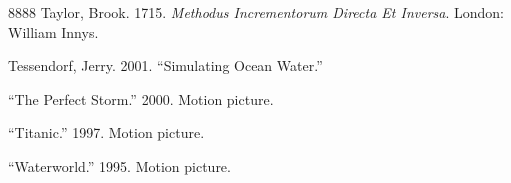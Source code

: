 \begin{thebibliography}{8888}
Taylor, Brook. 1715. \emph{Methodus Incrementorum Directa Et Inversa}.
London: William Innys.

Tessendorf, Jerry. 2001. {``Simulating Ocean Water.''}

{``The Perfect Storm.''} 2000. Motion picture.

{``Titanic.''} 1997. Motion picture.

{``Waterworld.''} 1995. Motion picture.
\end{thebibliography}

\endinput
